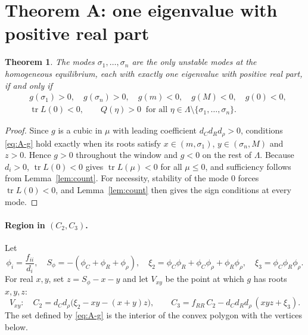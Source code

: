 \documentclass[11pt]{article}
\newtheorem{theorem}{Theorem}
\theoremstyle{remark}
\begin{document}
\section{Theorem A: one eigenvalue with positive real part}

\begin{theorem}\label{thm:A}
The modes $\sigma_1,\dots,\sigma_n$ are the only unstable modes at the homogeneous equilibrium, each with exactly one eigenvalue with positive real part, if and only if
\begin{align}
&g(\sigma_1)>0,\quad g(\sigma_n)>0,\quad g(m)<0,\quad g(M)<0,\quad g(0)<0, \label{eq:A-g}\\
&\operatorname{tr}L(0)<0,\qquad Q(\eta)>0\ \text{ for all }\eta\in\Lambda\setminus\{\sigma_1,\dots,\sigma_n\}. \label{eq:A-Q}
\end{align}
\end{theorem}

\begin{proof}
Since $g$ is a cubic in $\mu$ with leading coefficient $d_Cd_Rd_\rho>0$, conditions \eqref{eq:A-g} hold exactly when its roots satisfy $x\in(m,\sigma_1)$, $y\in(\sigma_n,M)$ and $z>0$. Hence $g>0$ throughout the window and $g<0$ on the rest of $\Lambda$. Because $d_i>0$, $\operatorname{tr}L(0)<0$ gives $\operatorname{tr}L(\mu)<0$ for all $\mu\le0$, and sufficiency follows from Lemma~\ref{lem:count}. For necessity, stability of the mode $0$ forces $\operatorname{tr}L(0)<0$, and Lemma~\ref{lem:count} then gives the sign conditions at every mode.
\end{proof}

\paragraph{Region in $(C_2,C_3)$.} Let
\[
\phi_i=\frac{f_{ii}}{d_i},\quad S_\phi=-(\phi_C+\phi_R+\phi_\rho),\quad
\xi_2=\phi_C\phi_R+\phi_C\phi_\rho+\phi_R\phi_\rho,\quad \xi_3=\phi_C\phi_R\phi_\rho.
\]
For real $x,y$, set $z=S_\phi-x-y$ and let $V_{xy}$ be the point at which $g$ has roots $x,y,z$:
\[
V_{xy}:\quad
C_2=d_Cd_\rho\bigl(\xi_2-xy-(x+y)z\bigr),\qquad
C_3=f_{RR}\,C_2-d_Cd_Rd_\rho\,(xyz+\xi_3).
\]
The set defined by \eqref{eq:A-g} is the interior of the convex polygon with the vertices below.
\end{document}
